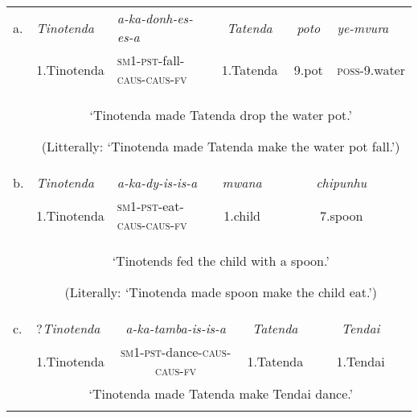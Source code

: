 \documentclass[output=paper,modfonts,nonflat]{langsci/langscibook}
\begin{document}
\tabletail{}
\tablelasttail{}
\begin{tabularx}{\textwidth}{XXXXXXXXX}
\lsptoprule
a. & {\itshape Tinotenda} & {\itshape a-ka-donh-es-es-a} & \multicolumn{3}{c}{{\itshape Tatenda}} & \multicolumn{2}{c}{{\itshape poto}} & {\itshape ye-mvura}\\
& 1.Tinotenda & \textsc{sm}1-\textsc{pst}{}-fall-\textsc{caus}{}-\textsc{caus}{}-\textsc{fv} & \multicolumn{3}{c}{1.Tatenda} & \multicolumn{2}{c}{9.pot} & \textsc{poss}{}-9.water\\
& \multicolumn{8}{c}{‘Tinotenda made Tatenda drop the water pot.’

(Litterally: ‘Tinotenda made Tatenda make the water pot fall.’)}\\
b. & \textit{Tinotenda} & {\itshape a-ka-dy-is-is-a} & \multicolumn{2}{c}{{\itshape mwana}} & \multicolumn{4}{c}{{\itshape chipunhu}}\\
& 1.Tinotenda & \textsc{sm}1-\textsc{pst}{}-eat-\textsc{caus}{}-\textsc{caus}{}-\textsc{fv} & \multicolumn{2}{c}{1.child} & \multicolumn{4}{c}{7.spoon}\\
& \multicolumn{8}{c}{‘Tinotends fed the child with a spoon.’

(Literally: ‘Tinotenda made spoon make the child eat.’)}\\
c. & ?\textit{Tinotenda} & \multicolumn{2}{c}{\textit{a-ka-tamba-is-is-a}} & \multicolumn{3}{c}{\textit{Tatenda}} & \multicolumn{2}{c}{\textit{Tendai}}\\
& 1.Tinotenda & \multicolumn{2}{c}{\textsc{sm}1-\textsc{pst}{}-dance-\textsc{caus}{}-\textsc{caus}{}-\textsc{fv}} & \multicolumn{3}{c}{1.Tatenda} & \multicolumn{2}{c}{1.Tendai}\\
& \multicolumn{8}{c}{‘Tinotenda made Tatenda make Tendai dance.’}\\
\lspbottomrule
\end{tabularx}
\ea\label{ex:key:}
\end{document}
